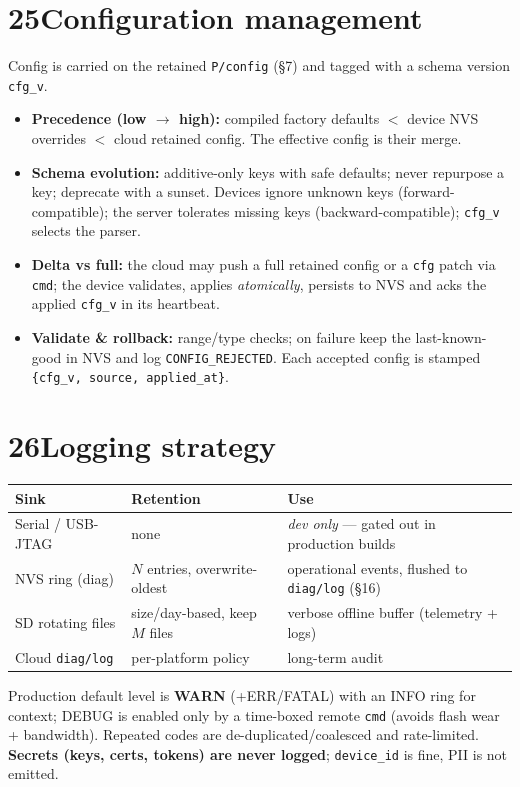 \section*{25\quad Configuration management}
Config is carried on the retained \texttt{P/config} (\S7) and tagged with a schema version
\texttt{cfg\_v}.
\begin{itemize}[leftmargin=1.4em,itemsep=1pt]
  \item \textbf{Precedence (low $\to$ high):} compiled factory defaults $<$ device NVS overrides $<$
        cloud retained config. The effective config is their merge.
  \item \textbf{Schema evolution:} additive-only keys with safe defaults; never repurpose a key;
        deprecate with a sunset. Devices ignore unknown keys (forward-compatible); the server tolerates
        missing keys (backward-compatible); \texttt{cfg\_v} selects the parser.
  \item \textbf{Delta vs full:} the cloud may push a full retained config or a \texttt{cfg} patch via
        \texttt{cmd}; the device validates, applies \emph{atomically}, persists to NVS and acks the
        applied \texttt{cfg\_v} in its heartbeat.
  \item \textbf{Validate \& rollback:} range/type checks; on failure keep the last-known-good in NVS and
        log \texttt{CONFIG\_REJECTED}. Each accepted config is stamped \texttt{\{cfg\_v, source, applied\_at\}}.
\end{itemize}

\section*{26\quad Logging strategy}
\begin{center}
\renewcommand{\arraystretch}{1.15}\small
\begin{tabularx}{\textwidth}{@{}l l X@{}}
\toprule
\textbf{Sink} & \textbf{Retention} & \textbf{Use} \\
\midrule
Serial / USB-JTAG & none & \emph{dev only} — gated out in production builds \\
NVS ring (diag) & $N$ entries, overwrite-oldest & operational events, flushed to \texttt{diag/log} (\S16) \\
SD rotating files & size/day-based, keep $M$ files & verbose offline buffer (telemetry + logs) \\
Cloud \texttt{diag/log} & per-platform policy & long-term audit \\
\bottomrule
\end{tabularx}
\end{center}
\noindent Production default level is \textbf{WARN} (+ERR/FATAL) with an INFO ring for context; DEBUG is
enabled only by a time-boxed remote \texttt{cmd} (avoids flash wear + bandwidth). Repeated codes are
de-duplicated/coalesced and rate-limited. \textbf{Secrets (keys, certs, tokens) are never logged};
\texttt{device\_id} is fine, PII is not emitted.

